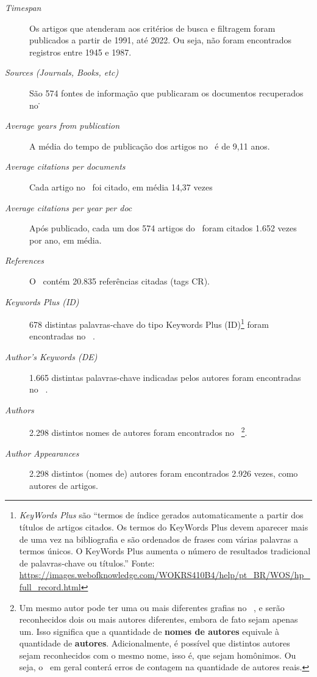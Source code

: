 \begin{description}
    \item [\textit{Timespan}] Os artigos que atenderam aos critérios de busca e filtragem foram publicados a partir de 1991, até 2022. Ou seja, não foram encontrados registros entre 1945 e 1987.
    \item [\textit{Sources (Journals, Books, etc)}] São 574 fontes de informação que publicaram os documentos recuperados no \dataset\.
    \item [\textit{Average years from publication}] A média do tempo de publicação dos artigos no \dataset\ é de 9,11 anos.
    \item [\textit{Average citations per documents}] Cada artigo no \dataset\ foi citado, em média 14,37 vezes
    \item [\textit{Average citations per year per doc}] Após publicado, cada um dos 574 artigos do \dataset\   foram citados 1.652 vezes por ano, em média.
    \item [\textit{References}] O \dataset\ contém 20.835 referências citadas (tags CR).
    \item [\textit{Keywords Plus (ID)}] 678 distintas palavras-chave do tipo Keywords Plus (ID)\footnote{\textit{KeyWords Plus} são ``termos de índice gerados automaticamente a partir dos títulos de artigos citados. Os termos do KeyWords Plus devem aparecer mais de uma vez na bibliografia e são ordenados de frases com várias palavras a termos únicos. O KeyWords Plus aumenta o número de resultados tradicional de palavras-chave ou títulos.'' Fonte: \url{https://images.webofknowledge.com/WOKRS410B4/help/pt_BR/WOS/hp_full_record.html}} foram encontradas no \dataset\   . 
    \item [\textit{Author's Keywords (DE)}] 1.665 distintas palavras-chave indicadas pelos autores foram encontradas no \dataset\  .
    \item [\textit{Authors}] 2.298 distintos nomes de autores foram encontrados no \dataset\  \footnote{Um mesmo autor pode ter uma ou mais diferentes grafias no \dataset\  , e serão reconhecidos dois ou mais autores diferentes, embora de fato sejam apenas um. Isso significa que a quantidade de \textbf{nomes de autores} equivale à quantidade de \textbf{autores}. Adicionalmente, é possível que distintos autores sejam reconhecidos com o mesmo nome, isso é, que sejam homônimos. Ou seja, o \dataset\   em geral conterá erros de contagem na quantidade de autores reais.}.
    \item [\textit{Author Appearances}] 2.298 distintos (nomes de) autores foram encontrados 2.926 vezes, como autores de artigos.

\end{description}
